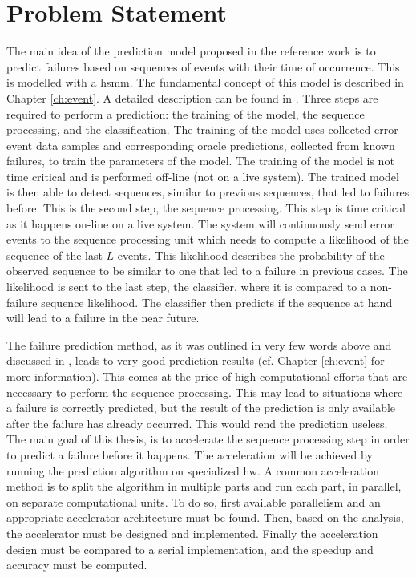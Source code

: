 \documentclass[mscthesis]{usiinfthesis}
\begin{document}
\section{Problem Statement}
\label{ch:_intro_prob}

The main idea of the prediction model proposed in the reference work
\cite{salfner08} is to predict failures based on sequences of events with their
time of occurrence. This is modelled with a \gls{hsmm}. The fundamental concept
of this model is described in Chapter \ref{ch:event}. A detailed description
can be found in \cite{salfner08}. Three steps are required to perform
a prediction: the training of the model, the sequence processing, and the
classification. The training of the model uses collected error event data
samples and corresponding oracle predictions, collected from known failures, to
train the parameters of the model. The training of the model is not time
critical and is performed off-line (not on a live system). The trained model is
then able to detect sequences, similar to previous sequences, that led to
failures before. This is the second step, the sequence processing. This step is
time critical as it happens on-line on a live system. The system will
continuously send error events to the sequence processing unit which needs to
compute a likelihood of the sequence of the last $L$ events. This likelihood
describes the probability of the observed sequence to be similar to one that
led to a failure in previous cases. The likelihood is sent to the last step,
the classifier, where it is compared to a non-failure sequence likelihood. The
classifier then predicts if the sequence at hand will lead to a failure in the
near future.

The failure prediction method, as it was outlined in very few words above and
discussed in \cite{salfner08}, leads to very good prediction results (cf.
Chapter \ref{ch:event} for more information). This comes at the price of high
computational efforts that are necessary to perform the sequence processing.
This may lead to situations where a failure is correctly predicted, but the
result of the prediction is only available after the failure has already
occurred. This would rend the prediction useless. The main goal of this thesis,
is to accelerate the sequence processing step in order to predict a failure
before it happens. The acceleration will be achieved by running the prediction
algorithm on specialized \gls{hw}. A common acceleration method is to split the
algorithm in multiple parts and run each part, in parallel, on separate
computational units. To do so, first available parallelism and an appropriate
accelerator architecture must be found. Then, based on the analysis, the
accelerator must be designed and implemented. Finally the acceleration design
must be compared to a serial implementation, and the speedup and accuracy must
be computed.
\end{document}
